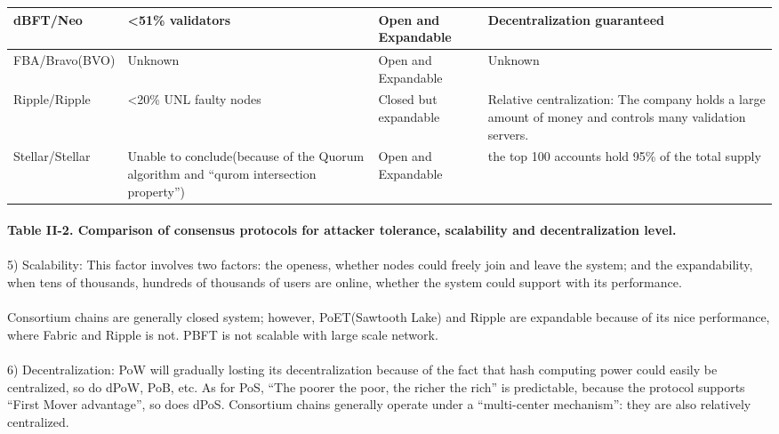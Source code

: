 \documentclass[]{article}
\begin{document}
\begin{CJK*}{UTF8}{gbsn}
\begin{tabular}{p{2cm}p{3cm}p{3cm}p{3cm}}
dBFT/Neo 
& \textless51\% validators 
& Open and Expandable 
& Decentralization guaranteed \\ \hline

FBA/Bravo\newline(BVO) 
& Unknown 
& Open and Expandable 
& Unknown  \\ \hline

Ripple/Ripple 
& \textless20\% UNL faulty nodes 
& Closed but expandable
& Relative centralization: The company holds a large amount of money and controls many validation servers.\\ \hline

Stellar/Stellar 
& Unable to conclude(because of the Quorum algorithm and ``qurom intersection property'') 
& Open and Expandable 
& the top 100 accounts hold 95\% of the total supply \\ \hline
\end{tabular}
\paragraph{Table II-2. Comparison of consensus protocols for attacker tolerance, scalability and decentralization level.}

\paragraph{}
5) Scalability: This factor involves two factors: the openess, whether nodes could freely join and leave the system; and the expandability, when tens of thousands, hundreds of thousands of users are online, whether the system could support with its performance.
\paragraph{}
Consortium chains are generally closed system; however, PoET(Sawtooth Lake) and Ripple are expandable because of its nice performance, where Fabric and Ripple is not. PBFT is not scalable with large scale network.
\paragraph{}
6) Decentralization: PoW will gradually losting its decentralization because of the fact that hash computing power could easily be centralized, so do dPoW, PoB, etc. As for PoS, ``The poorer the poor, the richer the rich'' is predictable, because the protocol supports ``First Mover advantage'', so does dPoS. Consortium chains generally operate under a ``multi-center mechanism'': they are also relatively centralized.

\end{CJK*}
\end{document}

